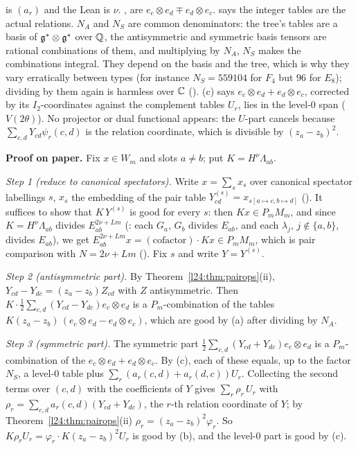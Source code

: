 \begin{dictionary}
 is $(a_r)$ and the Lean  is $\nu$. ,  are $e_c\otimes e_d\mp e_d\otimes e_c$.
 says the integer tables are the actual relations. $N_A$ and $N_S$ are common denominators: the tree's tables are a
basis of $\mathfrak g^*\otimes\mathfrak g^*$ over ${\mathbb{Q}}$, the antisymmetric and symmetric basis tensors are rational combinations of
them, and multiplying by $N_A$, $N_S$ makes the combinations integral. They depend on the basis and the tree, which is why
they vary erratically between types (for instance $N_S=559104$ for $F_4$ but $96$ for $E_8$); dividing by them again is
harmless over ${\mathbb{C}}$ (). (c) says $e_c\otimes e_d+e_d\otimes e_c$, corrected by its $I_2$-coordinates against the complement tables
$U_r$, lies in the level-0 span ($V(2\theta)$). No projector or dual functional appears: the $U$-part cancels because
$\sum_{c,d}Y_{cd}\psi_r(c,d)$ is the relation coordinate, which is divisible by $(z_a-z_b)^2$.
\end{dictionary}

\textbf{Proof on paper.} Fix $x\in W_m$ and slots $a\neq b$; put $K=H^\nu\Lambda_{ab}$.

\emph{Step 1 (reduce to canonical spectators).} Write $x=\sum_sx_s$ over canonical spectator labellings $s$, $x_s$ the
embedding of the pair table $Y^{(s)}_{cd}=x_{s[a\mapsto c,b\mapsto d]}$ (). It suffices to show
that $K\,Y^{(s)}$ is good for every $s$: then $Kx\in P_mM_m$, and since $K=H^\nu\Lambda_{ab}$ divides
$E_{ab}^{2\nu+Lm}$ (: each $G_a$, $G_b$ divides $E_{ab}$, and each $\lambda_j$, $j\notin\{a,b\}$, divides $E_{ab}$), we
get $E_{ab}^{2\nu+Lm}x=(\text{cofactor})\cdot Kx\in P_mM_m$, which is pair comparison with $N=2\nu+Lm$
(). Fix $s$ and write $Y=Y^{(s)}$.

\emph{Step 2 (antisymmetric part).} By Theorem~\ref{l24:thm:pairops}(ii), $Y_{cd}-Y_{dc}=(z_a-z_b)Z_{cd}$ with $Z$
antisymmetric. Then $K\cdot\frac12\sum_{c,d}(Y_{cd}-Y_{dc})e_c\otimes e_d$ is a $P_m$-combination of the tables
$K(z_a-z_b)\,(e_c\otimes e_d-e_d\otimes e_c)$, which are good by (a) after dividing by $N_A$.

\emph{Step 3 (symmetric part).} The symmetric part $\frac12\sum_{c,d}(Y_{cd}+Y_{dc})e_c\otimes e_d$ is a $P_m$-combination of the
$e_c\otimes e_d+e_d\otimes e_c$. By (c), each of these equals, up to the factor $N_S$, a level-0 table plus
$\sum_r(a_r(c,d)+a_r(d,c))U_r$. Collecting the second terms over $(c,d)$ with the coefficients of $Y$ gives
$\sum_r\rho_r\,U_r$ with $\rho_r=\sum_{c,d}a_r(c,d)(Y_{cd}+Y_{dc})$, the $r$-th relation coordinate of $Y$; by
Theorem~\ref{l24:thm:pairops}(ii) $\rho_r=(z_a-z_b)^2\varphi_r$. So $K\rho_rU_r=\varphi_r\cdot K(z_a-z_b)^2U_r$ is good by (b), and
the level-0 part is good by (c).

